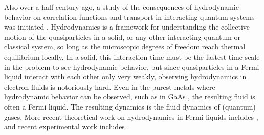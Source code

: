 Also over a half century ago,  a study of the consequences of hydrodynamic behavior on correlation functions and transport in interacting quantum systems was initiated \cite{kadanoff_hydrodynamic_1963}.    Hydrodynamics is a framework for understanding the collective motion of the quasiparticles in a solid, or any other interacting quantum or classical system, so long as the microscopic degrees of freedom reach thermal equilibrium locally.   In a solid, this interaction time must be the fastest time scale in the problem to see hydrodynamic behavior, but since quasiparticles in a Fermi liquid interact with each other only very weakly, observing hydrodynamics in electron fluids is notoriously hard.  Even in the purest metals where hydrodynamic behavior can be observed, such as in GaAs \cite{jong_hydrodynamic_1995, weber_observation_437, yang_doppler_153},  the resulting fluid is often a Fermi liquid.  The resulting dynamics is the fluid dynamics of (quantum) gases.  More recent theoretical work on hydrodynamics in Fermi liquids 
includes \cite{andreev_hydrodynamic_2011, mendoza_preturbulent_2011, tomadin_corbino_2014, principi_violation_2015, torre_nonlocal_2015, levitov_electron_2016}, and recent experimental work includes \cite{bandurin_negative_2016, moll_evidence_2016}.

